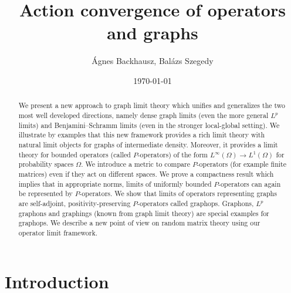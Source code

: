 \documentclass[a4wider]{amsart}
\title{Action convergence of operators and graphs}
\author{\'Agnes Backhausz, Bal\'azs Szegedy}
\date\today
\theoremstyle{definitionbreak}\newtheorem{D}[theorem]{Definition}
\theoremstyle{definitionbreak}\newtheorem*{D*}{Definition}
\begin{document}
		



\begin{abstract} We present a new approach to graph limit theory which unifies and generalizes the two most well developed directions, namely dense graph limits (even the more general $L^p$ limits) and Benjamini--Schramm limits (even in the stronger local-global setting). We illustrate by examples that this new framework provides a rich limit theory with natural limit objects for graphs of intermediate density. Moreover, it provides a limit theory for bounded operators (called $P$-operators) of the form $L^\infty(\Omega)\to L^1(\Omega)$ for probability spaces $\Omega$. We introduce a metric to compare $P$-operators (for example finite matrices) even if they act on different spaces. We prove a compactness result which implies that in appropriate norms, limits of uniformly bounded $P$-operators can again be represented by $P$-operators. We show that limits of operators representing graphs are self-adjoint, positivity-preserving $P$-operators called graphops. Graphons, $L^p$ graphons and graphings (known from graph limit theory) are special examples for graphops. We describe a new point of view on random matrix theory using our operator limit framework. %
\end{abstract}

\maketitle




\section{Introduction} 
\end{document}
